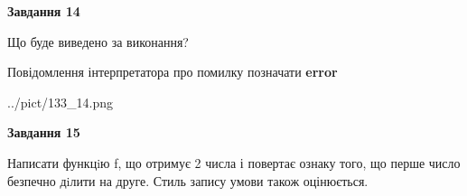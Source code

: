 \documentclass[11pt, ukrainian]{article}
\begin{document}
{\begin {large}
{\begin {center}\textbf{Завдання 14}\end {center}}\par
Що буде виведено за виконання? \par
Повідомлення інтерпретатора про помилку позначати \textbf{error}

\begin{center}
	{../pict/133_14.png}
\end{center}
\newpage

{\begin {center}\textbf{Завдання 15}\end {center}}\par

Написати функцiю f, що отримує 2 числа і повертає ознаку того, що перше число безпечно дiлити на друге. Стиль запису умови також оцінюється.\par
\newpage

\end {large}}
\end{document}

